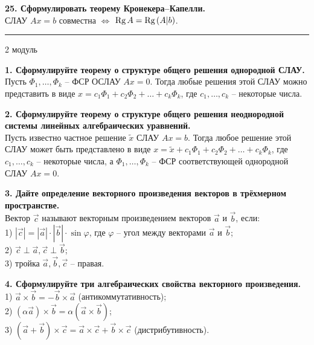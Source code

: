 \documentclass[11pt,a4paper]{article}
\newcommand{\Rg}[1]{\mathrm{Rg}\hspace{0.5mm}#1}
\newcommand{\vect}[1]{\overrightarrow{#1}}
\begin{document}
\textbf{25. Сформулировать теорему Кронекера--Капелли.\\}
СЛАУ $Ax = b$ совместна $\Leftrightarrow$ $\Rg A = \Rg (A \vert b)$.

\rule{\linewidth}{0.3mm}

\vspace{1mm}
\begin{center}
\begin{LARGE}
\textsf{2 модуль}
\end{LARGE}
\end{center}
\vspace{1mm}

\textbf{1. Сформулируйте теорему о структуре общего решения однородной СЛАУ.\\}
Пусть $\Phi_1, \hdots, \Phi_k$ -- ФСР ОСЛАУ $Ax = 0$. Тогда любые решения этой СЛАУ можно представить в виде $x = c_1 \Phi_1 + c_2 \Phi_2 + \hdots + c_k \Phi_k$, где $c_1, \hdots, c_k$ -- некоторые числа.

\textbf{2. Сформулируйте теорему о структуре общего решения неоднородной системы линейных алгебраических уравнений.\\}
Пусть известно частное решение $\tilde{x}$ СЛАУ $Ax = b$. Тогда любое решение этой СЛАУ может быть представлено в виде $x = \tilde{x} + c_1 \Phi_1 + c_2 \Phi_2 + \hdots + c_k \Phi_k$, где $c_1, \hdots, c_k$ -- некоторые числа, а $\Phi_1, \hdots, \Phi_k$ -- ФСР соответствующей однородной СЛАУ $Ax = 0$.
\pagebreak

\textbf{3. Дайте определение векторного произведения векторов в трёхмерном пространстве.\\}
Вектор $\vect{c}$ называют векторным произведением векторов $\vect{a}$ и $\vect{b}$, если:\\
1) $| \vect{c} | = | \vect{a} | \cdot | \vect{b} | \cdot \sin \varphi$, где $\varphi$ -- угол между векторами $\vect{a}$ и $\vect{b}$;\\
2) $\vect{c} \perp \vect{a}, \vect{c} \perp \vect{b}$;\\
3) тройка $\vect{a}, \vect{b}, \vect{c}$ -- правая.

\textbf{4. Сформулируйте три алгебраических свойства векторного произведения.\\}
1) $\vect{a} \times \vect{b} = - \vect{b} \times \vect{a}$ (антикоммутативность);\\
2) $\left( \alpha \vect{a} \right) \times \vect{b} = \alpha \left( \vect{a} \times \vect{b} \right)$;\\
3) $\left( \vect{a} + \vect{b} \right) \times \vect{c} = \vect{a} \times \vect{c} + \vect{b} \times \vect{c}$ (дистрибутивность).
\end{document}
